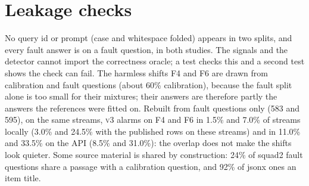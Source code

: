 \documentclass[11pt]{article}
\newcommand{\vthree}{\textsc{v3}}
\begin{document}
\section{Leakage checks}
\label{app:leak}
No query id or prompt (case and whitespace folded) appears in two splits, and every
fault answer is on a fault question, in both studies. The signals and the detector
cannot import the correctness oracle; a test checks this and a second test shows
the check can fail. The harmless shifts F4 and F6 are drawn from calibration and
fault questions (about 60\% calibration), because the fault split alone is too small
for their mixtures; their answers are therefore partly the answers the references
were fitted on. Rebuilt from fault questions only (583 and 595), on the same
streams, \vthree{} alarms on F4 and F6 in 1.5\% and 7.0\% of streams locally
(3.0\% and 24.5\% with the published rows on these streams) and in 11.0\% and 33.5\% on the API
(8.5\% and 31.0\%): the overlap does not make the shifts look quieter. Some source
material is shared by construction: 24\% of \textsf{squad2} fault questions share
a passage with a calibration question, and 92\% of \textsf{jsonx} ones an item
title.
\end{document}
